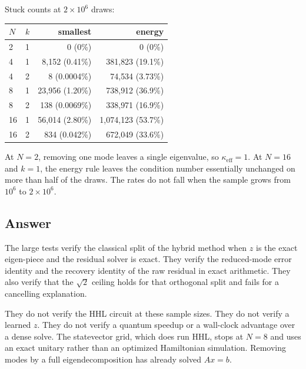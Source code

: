\documentclass[11pt,a4paper]{article}
\begin{document}
Stuck counts at \(2\times 10^{6}\) draws:

\begin{center}
\begin{tabular}{@{}llrr@{}}
\toprule
\(N\) & \(k\) & smallest & energy \\
\midrule
2 & 1 & 0 (0\%) & 0 (0\%) \\
4 & 1 & 8{,}152 (0.41\%) & 381{,}823 (19.1\%) \\
4 & 2 & 8 (0.0004\%) & 74{,}534 (3.73\%) \\
8 & 1 & 23{,}956 (1.20\%) & 738{,}912 (36.9\%) \\
8 & 2 & 138 (0.0069\%) & 338{,}971 (16.9\%) \\
16 & 1 & 56{,}014 (2.80\%) & 1{,}074{,}123 (53.7\%) \\
16 & 2 & 834 (0.042\%) & 672{,}049 (33.6\%) \\
\bottomrule
\end{tabular}
\end{center}

At \(N=2\), removing one mode leaves a single eigenvalue, so \(\kappa_{\mathrm{eff}}=1\).
At \(N=16\) and \(k=1\), the energy rule leaves the condition number essentially unchanged on more than half of the draws.
The rates do not fall when the sample grows from \(10^{6}\) to \(2\times 10^{6}\).

\subsection{Answer}
The large tests verify the classical split of the hybrid method when \(z\) is the exact eigen-piece and the residual solver is exact.
They verify the reduced-mode error identity and the recovery identity of the raw residual in exact arithmetic.
They also verify that the \(\sqrt{2}\) ceiling holds for that orthogonal split and fails for a cancelling explanation.

They do not verify the HHL circuit at these sample sizes.
They do not verify a learned \(z\).
They do not verify a quantum speedup or a wall-clock advantage over a dense solve.
The statevector grid, which does run HHL, stops at \(N=8\) and uses an exact unitary rather than an optimized Hamiltonian simulation.
Removing modes by a full eigendecomposition has already solved \(Ax=b\).



\end{document}
